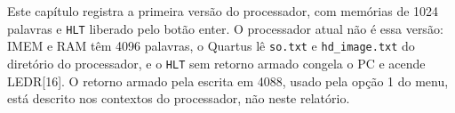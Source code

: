\documentclass[
	12pt,				%
	openright,			%
	a4paper,			%
	english,			%
	french,				%
	spanish,			%
	brazil,				%
	]{abntex2}
\begin{document}
Este capítulo registra a primeira versão do processador, com memórias de 1024 palavras e \texttt{HLT} liberado pelo botão enter. O processador atual não é essa versão: IMEM e RAM têm 4096 palavras, o Quartus lê \texttt{so.txt} e \texttt{hd\_image.txt} do diretório do processador, e o \texttt{HLT} sem retorno armado congela o PC e acende LEDR[16]. O retorno armado pela escrita em 4088, usado pela opção 1 do menu, está descrito nos contextos do processador, não neste relatório.



\postextual





\begin{apendicesenv}



\end{apendicesenv}



\printindex
\end{document}
